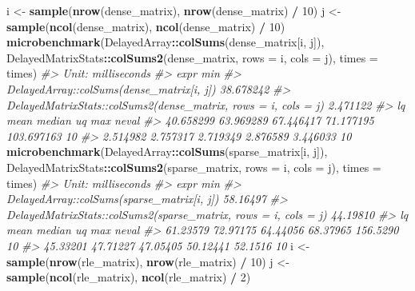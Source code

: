\documentclass[]{book}
\newenvironment{Shaded}{\begin{snugshade}}{\end{snugshade}}
\newcommand{\KeywordTok}[1]{\textcolor[rgb]{0.13,0.29,0.53}{\textbf{#1}}}
\newcommand{\DataTypeTok}[1]{\textcolor[rgb]{0.13,0.29,0.53}{#1}}
\newcommand{\DecValTok}[1]{\textcolor[rgb]{0.00,0.00,0.81}{#1}}
\newcommand{\StringTok}[1]{\textcolor[rgb]{0.31,0.60,0.02}{#1}}
\newcommand{\CommentTok}[1]{\textcolor[rgb]{0.56,0.35,0.01}{\textit{#1}}}
\newcommand{\OperatorTok}[1]{\textcolor[rgb]{0.81,0.36,0.00}{\textbf{#1}}}
\newcommand{\NormalTok}[1]{#1}
\begin{document}
\begin{Shaded}
\begin{Highlighting}[]
\NormalTok{i <-}\StringTok{ }\KeywordTok{sample}\NormalTok{(}\KeywordTok{nrow}\NormalTok{(dense_matrix), }\KeywordTok{nrow}\NormalTok{(dense_matrix) }\OperatorTok{/}\StringTok{ }\DecValTok{10}\NormalTok{)}
\NormalTok{j <-}\StringTok{ }\KeywordTok{sample}\NormalTok{(}\KeywordTok{ncol}\NormalTok{(dense_matrix), }\KeywordTok{ncol}\NormalTok{(dense_matrix) }\OperatorTok{/}\StringTok{ }\DecValTok{10}\NormalTok{)}
\KeywordTok{microbenchmark}\NormalTok{(DelayedArray}\OperatorTok{::}\KeywordTok{colSums}\NormalTok{(dense_matrix[i, j]),}
\NormalTok{               DelayedMatrixStats}\OperatorTok{::}\KeywordTok{colSums2}\NormalTok{(dense_matrix, }\DataTypeTok{rows =}\NormalTok{ i, }\DataTypeTok{cols =}\NormalTok{ j),}
               \DataTypeTok{times =}\NormalTok{ times)}
\CommentTok{#> Unit: milliseconds}
\CommentTok{#>                                                            expr       min}
\CommentTok{#>                       DelayedArray::colSums(dense_matrix[i, j]) 38.678242}
\CommentTok{#>  DelayedMatrixStats::colSums2(dense_matrix, rows = i, cols = j)  2.471122}
\CommentTok{#>         lq      mean    median        uq        max neval}
\CommentTok{#>  40.658299 63.969289 67.446417 71.177195 103.697163    10}
\CommentTok{#>   2.514982  2.757317  2.719349  2.876589   3.446033    10}
\KeywordTok{microbenchmark}\NormalTok{(DelayedArray}\OperatorTok{::}\KeywordTok{colSums}\NormalTok{(sparse_matrix[i, j]),}
\NormalTok{               DelayedMatrixStats}\OperatorTok{::}\KeywordTok{colSums2}\NormalTok{(sparse_matrix, }\DataTypeTok{rows =}\NormalTok{ i, }\DataTypeTok{cols =}\NormalTok{ j),}
               \DataTypeTok{times =}\NormalTok{ times)}
\CommentTok{#> Unit: milliseconds}
\CommentTok{#>                                                             expr      min}
\CommentTok{#>                       DelayedArray::colSums(sparse_matrix[i, j]) 58.16497}
\CommentTok{#>  DelayedMatrixStats::colSums2(sparse_matrix, rows = i, cols = j) 44.19810}
\CommentTok{#>        lq     mean   median       uq      max neval}
\CommentTok{#>  61.23579 72.97175 64.44056 68.37965 156.5290    10}
\CommentTok{#>  45.33201 47.71227 47.05405 50.12441  52.1516    10}
\NormalTok{i <-}\StringTok{ }\KeywordTok{sample}\NormalTok{(}\KeywordTok{nrow}\NormalTok{(rle_matrix), }\KeywordTok{nrow}\NormalTok{(rle_matrix) }\OperatorTok{/}\StringTok{ }\DecValTok{10}\NormalTok{)}
\NormalTok{j <-}\StringTok{ }\KeywordTok{sample}\NormalTok{(}\KeywordTok{ncol}\NormalTok{(rle_matrix), }\KeywordTok{ncol}\NormalTok{(rle_matrix) }\OperatorTok{/}\StringTok{ }\DecValTok{2}\NormalTok{)}

\end{Highlighting}
\end{Shaded}
\end{document}
